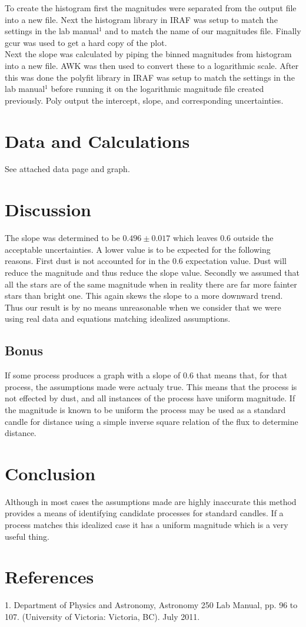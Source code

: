 \documentclass{article}
\begin{document}
To create the histogram first the magnitudes were separated from the output file into a new file. Next the histogram library in IRAF was setup to match the settings in the lab manual$^1$ and to match the name of our magnitudes file. Finally gcur was used to get a hard copy of the plot.\\

Next the slope was calculated by piping the binned magnitudes from histogram into a new file. AWK was then used to convert these to a logarithmic scale. After this was done the polyfit library in IRAF was setup to match the settings in the lab manual$^1$ before running it on the logarithmic magnitude file created previously. Poly output the intercept, slope, and corresponding uncertainties. 
\section{Data and Calculations}
See attached data page and graph.
\section{Discussion}
The slope was determined to be $0.496\pm0.017$ which leaves 0.6 outside the acceptable uncertainties. A lower value is to be expected for the following reasons. First dust is not accounted for in the 0.6 expectation value. Dust will reduce the magnitude and thus reduce the slope value. Secondly we assumed that all the stars are of the same magnitude when in reality there are far more fainter stars than bright one. This again skews the slope to a more downward trend. Thus our result is by no means unreasonable when we consider that we were using real data and equations matching idealized assumptions.

\subsection{Bonus}
If some process produces a graph with a slope of 0.6 that means that, for that process, the assumptions made were actualy true. This means that the process is not effected by dust, and all instances of the process have uniform magnitude. If the magnitude is known to be uniform the process may be used as a standard candle for distance using a simple inverse square relation of the flux to determine distance.
\section{Conclusion}
Although in most cases the assumptions made are highly inaccurate this method provides a means of identifying candidate processes for standard candles. If a process matches this idealized case it has a uniform magnitude which is a very useful thing.
\section{References}
1. Department of Physics and Astronomy, Astronomy 250 Lab Manual, pp. 96 to 107. (University of Victoria: Victoria, BC). July 2011.
\end{document}
